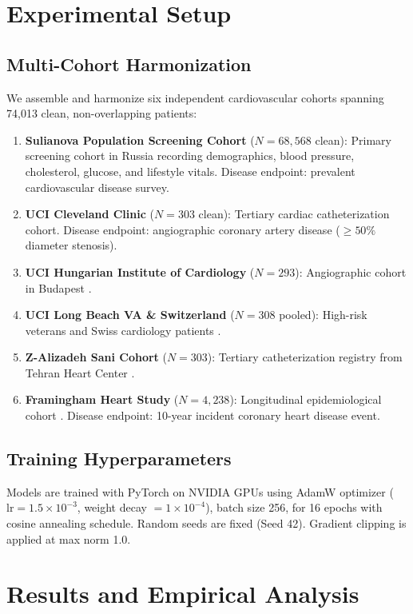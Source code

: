 \documentclass[journal]{IEEEtran}
\begin{document}
\section{Experimental Setup}

\subsection{Multi-Cohort Harmonization}
We assemble and harmonize six independent cardiovascular cohorts spanning 74,013 clean, non-overlapping patients:
\begin{enumerate}
    \item \textbf{Sulianova Population Screening Cohort} ($N = 68,568$ clean): Primary screening cohort in Russia recording demographics, blood pressure, cholesterol, glucose, and lifestyle vitals. Disease endpoint: prevalent cardiovascular disease survey.
    \item \textbf{UCI Cleveland Clinic} ($N = 303$ clean): Tertiary cardiac catheterization cohort. Disease endpoint: angiographic coronary artery disease ($\ge 50\%$ diameter stenosis).
    \item \textbf{UCI Hungarian Institute of Cardiology} ($N = 293$): Angiographic cohort in Budapest \cite{janosi1988}.
    \item \textbf{UCI Long Beach VA \& Switzerland} ($N = 308$ pooled): High-risk veterans and Swiss cardiology patients \cite{pfisterer1988}.
    \item \textbf{Z-Alizadeh Sani Cohort} ($N = 303$): Tertiary catheterization registry from Tehran Heart Center \cite{alizadehsani2013}.
    \item \textbf{Framingham Heart Study} ($N = 4,238$): Longitudinal epidemiological cohort \cite{dawber1951}. Disease endpoint: 10-year incident coronary heart disease event.
\end{enumerate}

\subsection{Training Hyperparameters}
Models are trained with PyTorch on NVIDIA GPUs using AdamW optimizer ($\text{lr} = 1.5 \times 10^{-3}$, weight decay $= 1 \times 10^{-4}$), batch size 256, for 16 epochs with cosine annealing schedule. Random seeds are fixed (Seed 42). Gradient clipping is applied at max norm 1.0.

\section{Results and Empirical Analysis}
\end{document}
